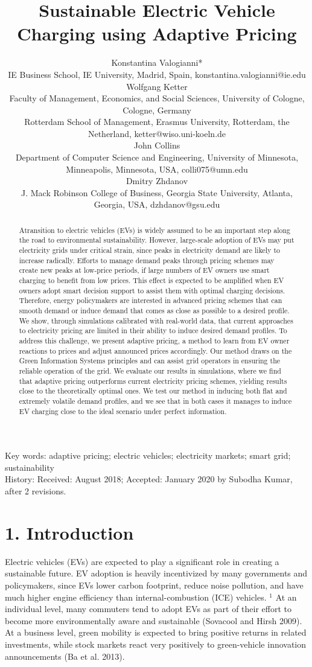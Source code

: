 \documentclass[10pt]{article}
\title{Sustainable Electric Vehicle Charging using Adaptive Pricing }
\author{Konstantina Valogianni*\\
IE Business School, IE University, Madrid, Spain, konstantina.valogianni@ie.edu\\
Wolfgang Ketter\\
Faculty of Management, Economics, and Social Sciences, University of Cologne, Cologne, Germany\\
Rotterdam School of Management, Erasmus University, Rotterdam, the Netherland, ketter@wiso.uni-koeln.de\\
John Collins\\
Department of Computer Science and Engineering, University of Minnesota, Minneapolis, Minnesota, USA, colli075@umn.edu\\
Dmitry Zhdanov\\
J. Mack Robinson College of Business, Georgia State University, Atlanta, Georgia, USA, dzhdanov@gsu.edu}
\date{}
\begin{document}
\maketitle


\begin{abstract}
Atransition to electric vehicles (EVs) is widely assumed to be an important step along the road to environmental sustainability. However, large-scale adoption of EVs may put electricity grids under critical strain, since peaks in electricity demand are likely to increase radically. Efforts to manage demand peaks through pricing schemes may create new peaks at low-price periods, if large numbers of EV owners use smart charging to benefit from low prices. This effect is expected to be amplified when EV owners adopt smart decision support to assist them with optimal charging decisions. Therefore, energy policymakers are interested in advanced pricing schemes that can smooth demand or induce demand that comes as close as possible to a desired profile. We show, through simulations calibrated with real-world data, that current approaches to electricity pricing are limited in their ability to induce desired demand profiles. To address this challenge, we present adaptive pricing, a method to learn from EV owner reactions to prices and adjust announced prices accordingly. Our method draws on the Green Information Systems principles and can assist grid operators in ensuring the reliable operation of the grid. We evaluate our results in simulations, where we find that adaptive pricing outperforms current electricity pricing schemes, yielding results close to the theoretically optimal ones. We test our method in inducing both flat and extremely volatile demand profiles, and we see that in both cases it manages to induce EV charging close to the ideal scenario under perfect information.
\end{abstract}

Key words: adaptive pricing; electric vehicles; electricity markets; smart grid; sustainability\\
History: Received: August 2018; Accepted: January 2020 by Subodha Kumar, after 2 revisions.

\section*{1. Introduction}
Electric vehicles (EVs) are expected to play a significant role in creating a sustainable future. EV adoption is heavily incentivized by many governments and policymakers, since EVs lower carbon footprint, reduce noise pollution, and have much higher engine efficiency than internal-combustion (ICE) vehicles. ${ }^{1}$ At an individual level, many commuters tend to adopt EVs as part of their effort to become more environmentally aware and sustainable (Sovacool and Hirsh 2009). At a business level, green mobility is expected to bring positive returns in related investments, while stock markets react very positively to green-vehicle innovation announcements (Ba et al. 2013).
\end{document}
